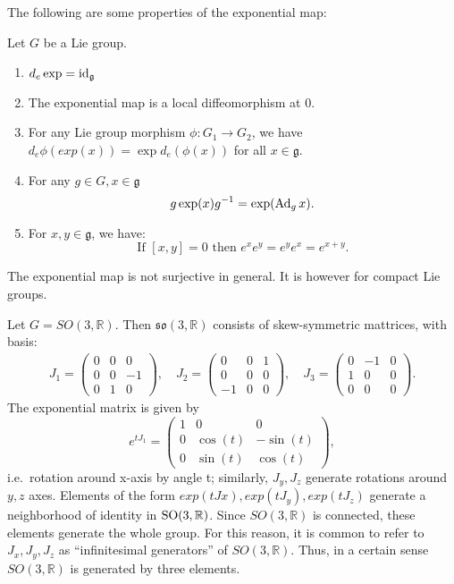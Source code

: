 \documentclass{report}
\begin{document}
The following are some properties of the exponential map:
\begin{theorem}
    Let $G$ be a Lie group.
    \begin{enumerate}[label = (\roman*)]
        \item $d_{e} \exp = \operatorname{id}_{\mathfrak g}$
        \item The exponential map is a local diffeomorphism at $0$.
        \item For any Lie group morphism $\phi:G_1 \to G_2$, we have $d_e \phi (exp(x)) = \exp d_e (\phi(x))$ for all $x\in \mathfrak g$.
        \item For any $g \in G, x \in \mathfrak g$
        \[
        g \exp(x) g^{-1} = \exp(\operatorname{Ad}_g x).
        \]
        \item For $x, y \in \mathfrak g$, we have:
        \[
        \text{If } [x,y] = 0 \text{ then } e^x e^y = e^y e^x = e^{x+y}.
        \]
    \end{enumerate}
\end{theorem}

\begin{remark}
    The exponential map is not surjective in general. It is however for compact Lie groups.
\end{remark}

\begin{example}
    Let $G = SO(3, \mathbb R)$.
    Then $\mathfrak{so}(3, \mathbb R)$ consists of skew-symmetric mattrices, with basis:
    \begin{align*}
        J_1 = \begin{pmatrix} 0 & 0 & 0 \\ 0 & 0 & -1 \\ 0 & 1 & 0 \end{pmatrix}, \quad
        J_2 = \begin{pmatrix} 0 & 0 & 1 \\ 0 & 0 & 0 \\ -1 & 0 & 0 \end{pmatrix}, \quad
        J_3 = \begin{pmatrix} 0 & -1 & 0 \\ 1 & 0 & 0 \\ 0 & 0 & 0 \end{pmatrix}.
    \end{align*}
    The exponential matrix is given by
    \[
    e^{tJ_1} = 
    \begin{pmatrix}
        1 & 0 & 0 \\
        0 & \cos(t) & -\sin(t) \\
        0 & \sin(t) & \cos(t)
    \end{pmatrix},
    \]
    i.e.\ rotation around x-axis by angle t; similarly, $J_y, J_z$ generate rotations around
    $y, z$ axes.
    Elements of the form $exp(tJx), exp(tJ_y ), exp(tJ_z )$ generate
    a neighborhood of identity in $\operatorname{{\mathrm{SO}}}(3, \mathbb R)$.
    Since $SO(3, \mathbb R)$ is connected, these elements generate the whole group. 
    For this reason, it is common to refer to $J_x , J_y , J_z$ as “inﬁnitesimal generators” of $SO(3, \mathbb R)$. Thus,
    in a certain sense $SO(3, \mathbb R)$ is generated by three elements.
\end{example}
\end{document}

